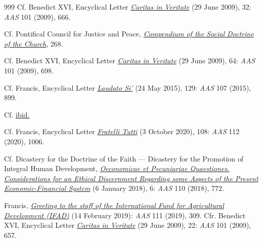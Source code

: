\documentclass{article}
\begin{document}
\begin{thebibliography}{999}
 Cf. Benedict XVI, Encyclical Letter \href{https://www.vatican.va/content/benedict-xvi/en/encyclicals/documents/hf_ben-xvi_enc_20090629_caritas-in-veritate.html}{\emph{Caritas in Veritate}} (29 June 2009), 32: \emph{AAS} 101 (2009), 666.

 Cf. Pontifical Council for Justice and Peace, \href{https://www.vatican.va/roman_curia/pontifical_councils/justpeace/documents/rc_pc_justpeace_doc_20060526_compendio-dott-soc_en.html}{\emph{Compendium of the Social Doctrine of the Church}}, 268.

 Cf. Benedict XVI, Encyclical Letter \href{https://www.vatican.va/content/benedict-xvi/en/encyclicals/documents/hf_ben-xvi_enc_20090629_caritas-in-veritate.html}{\emph{Caritas in Veritate}} (29 June 2009), 64: \emph{AAS} 101 (2009), 698.

 Cf. Francis, Encyclical Letter \href{https://www.vatican.va/content/francesco/en/encyclicals/documents/papa-francesco_20150524_enciclica-laudato-si.html}{\emph{Laudato Si'}} (24 May 2015), 129: \emph{AAS} 107 (2015), 899.

 Cf. \href{https://www.vatican.va/content/francesco/en/encyclicals/documents/papa-francesco_20150524_enciclica-laudato-si.html}{ibid.}

 Cf. Francis, Encyclical Letter \href{https://www.vatican.va/content/francesco/en/encyclicals/documents/papa-francesco_20201003_enciclica-fratelli-tutti.html}{\emph{Fratelli Tutti}} (3 October 2020), 108: \emph{AAS} 112 (2020), 1006.

 Cf. Dicastery for the Doctrine of the Faith --- Dicastery for the Promotion of Integral Human Development, \href{https://www.vatican.va/roman_curia/congregations/cfaith/documents/rc_con_cfaith_doc_20180106_oeconomicae-et-pecuniariae_en.html}{\emph{Oeconomicae et Pecuniariae Quaestiones. Considerations for an Ethical Discernment Regarding some Aspects of the Present Economic-Financial System}} (6 January 2018), 6: \emph{AAS} 110 (2018), 772.

 Francis, \href{https://www.vatican.va/content/francesco/en/speeches/2019/february/documents/papa-francesco_20190214_fao.html}{\emph{Greeting to the staff of the International Fund for Agricultural Development (IFAD)}} (14 February 2019): \emph{AAS} 111 (2019), 309. Cfr. Benedict XVI, Encyclical Letter \href{https://www.vatican.va/content/benedict-xvi/en/encyclicals/documents/hf_ben-xvi_enc_20090629_caritas-in-veritate.html}{\emph{Caritas in Veritate}} (29 June 2009), 22: \emph{AAS} 101 (2009), 657.


\end{thebibliography}
\end{document}
